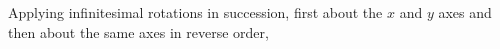 Applying infinitesimal rotations in succession, first about the $x$ and $y$
axes and then about the same axes in reverse order,
